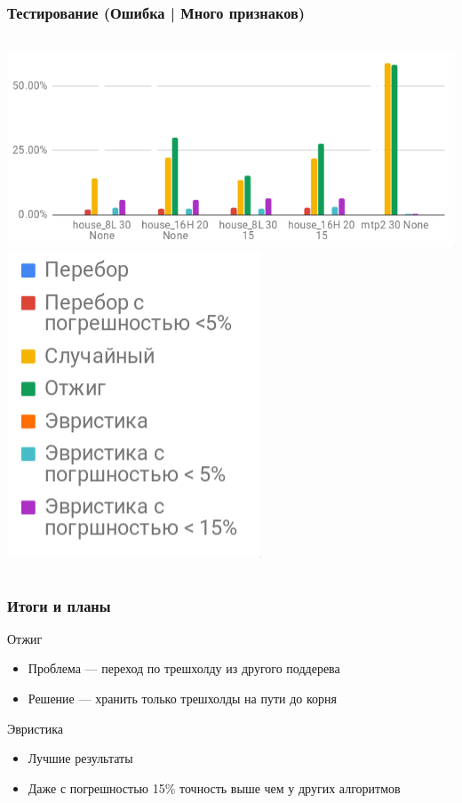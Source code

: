 \documentclass{beamer}
\begin{document}
\begin{frame}
    \frametitle{Тестирование (Ошибка | Много признаков)}
    \vfill
    \begin{columns}
        \includegraphics[width=\textwidth]{error_features.png}
        \includegraphics[width=\textwidth]{time_legend.png}
    \end{columns}
\end{frame}

\begin{frame}
    \frametitle{Итоги и планы}
    Отжиг
    \begin{itemize}
            \item Проблема --- переход по трешхолду из другого поддерева
            \item Решение --- хранить только трешхолды на пути до корня 
    \end{itemize}
    Эвристика
    \begin{itemize}
            \item Лучшие результаты
            \item Даже с погрешностью 15\% точность выше чем у других алгоритмов
    \end{itemize}
\end{frame}
\end{document}
